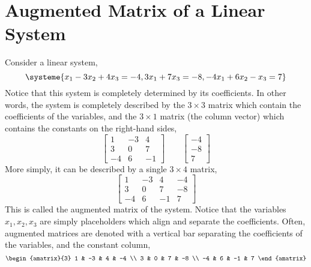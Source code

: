 \documentclass[letterpaper,12pt]{article}
\begin{document}
\section*{Augmented Matrix of a Linear System}
Consider a linear system,
\begin{equation*}
    \systeme{x_1 - 3x_2 + 4x_3 = -4, 3x_1 + 7x_3 = -8, -4x_1 + 6x_2 - x_3 = 7}
\end{equation*}
Notice that this system is completely determined by its coefficients. In other words, the system is completely described by the $3 \times 3$ matrix which contain the coefficients of the variables, and the $3 \times 1$ matrix (the column vector) which contains the constants on the right-hand sides,
\begin{equation*}
    \begin{bmatrix} 1 & -3 & 4 \\ 3 & 0 & 7 \\ -4 & 6 & -1 \end{bmatrix} \qquad \begin{bmatrix} -4 \\ -8 \\ 7 \end{bmatrix}
\end{equation*}
More simply, it can be described by a single $3 \times 4$ matrix,
\begin{equation*}
    \begin{bmatrix} 1 & -3 & 4 & -4 \\ 3 & 0 & 7 & -8 \\ -4 & 6 & -1 & 7 \end{bmatrix}
\end{equation*}
This is called the augmented matrix of the system. Notice that the variables $x_1, x_2, x_3$ are simply placeholders which align and separate the coefficients. Often, augmented matrices are denoted with a vertical bar separating the coefficients of the variables, and the constant column,
\begin{equation*}
    \begin{amatrix}{3} 1 & -3 & 4 & -4 \\ 3 & 0 & 7 & -8 \\ -4 & 6 & -1 & 7 \end{amatrix}
\end{equation*}
\end{document}
